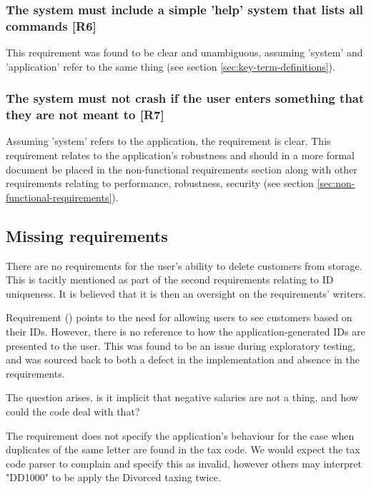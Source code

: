 \subsubsection{The system must include a simple 'help' system that lists all commands [R6]}

This requirement was found to be clear and unambiguous, assuming 'system' and 'application' refer to the same thing (see section \ref{sec:key-term-definitions}). 

\subsubsection{The system must not crash if the user enters something that they are not meant to [R7]}
Assuming 'system' refers to the application, the requirement is clear. 
This requirement relates to the application's robustness and should in a more formal document  be placed in the non-functional requirements section along with other requirements relating to performance, robustness, security (see section \ref{sec:non-functional-requirements}).


\subsection{Missing requirements}

There are no requirements for the user's ability to delete customers from storage. This is tacitly mentioned as part of the second requirements relating to ID uniqueness. It is believed that it is then an oversight on the requirements' writers. 
\par
Requirement (\RFour) points to the need for allowing users to see customers based on their IDs. However, there is no reference to how the application-generated IDs are presented to the user. This was found to be an issue during exploratory testing, and was sourced back to both a defect in the implementation and absence in the requirements. 
\par
The question arises, is it implicit that negative salaries are not a thing, and how could the code deal with that? 
\par
The requirement does not specify the application's behaviour for the case when duplicates of the same letter are found in the tax code. We would expect the tax code parser to complain and specify this as invalid, however others may interpret "DD1000" to be apply the Divorced taxing twice. 



% 


